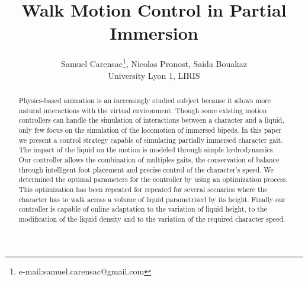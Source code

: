 \documentclass[conference]{acmsiggraph}
\title{Walk Motion Control in Partial Immersion}
\author{Samuel Carensac\thanks{e-mail:samuel.carensac@gmail.com}, Nicolas Pronost, Saida Bouakaz\\University Lyon 1, LIRIS}
\begin{document}

\maketitle

\begin{abstract}

Physics-based animation is an increasingly studied subject because it allows more natural interactions with the virtual environment. Though some existing motion controllers can handle the simulation of interactions between a character and a liquid, only few focus on the simulation of the locomotion of immersed bipeds. In this paper we present a control strategy capable of simulating partially immersed character gait. The impact of the liquid on the motion is modeled through simple hydrodynamics. Our controller allows the combination of multiples gaits, the conservation of balance through intelligent foot placement and precise control of the character's speed. We determined the optimal parameters for the controller by using an optimization process. This optimization has been repeated for repeated for several scenarios where the character has to walk across a volume of liquid parametrized by its height. 
Finally our controller is capable of online adaptation to the variation of liquid height, to the modification of the liquid density and to the variation of the required character speed.

\end{abstract}

\end{document}
